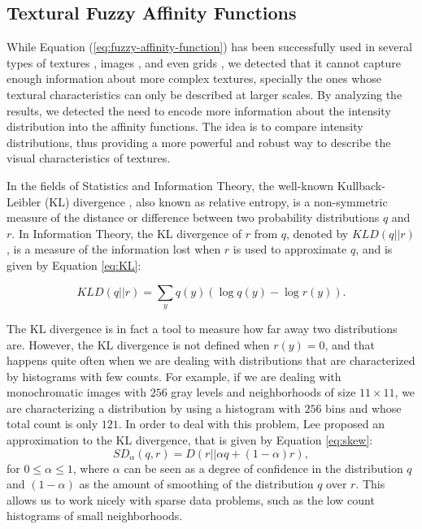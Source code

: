 \documentclass[10pt,twocolumn,letterpaper]{article}
\begin{document}
\subsection{Textural Fuzzy Affinity Functions}

While Equation (\ref{eq:fuzzy-affinity-function}) has been successfully used in several types of textures \cite{CARV12a}, images \cite{CARV05a,CARV06a}, and even grids \cite{CARV01a}, we detected that it cannot capture enough information about more complex textures, specially the ones whose textural characteristics can only be described at larger scales. By analyzing the results, we detected the need to encode more information about the intensity distribution into the affinity functions. The idea is to compare intensity distributions, thus providing a more powerful and robust way to describe the visual characteristics of textures. 

In the fields of Statistics and Information Theory, the well-known Kullback-Leibler (KL) divergence \cite{KULL51}, also known as relative entropy, is a non-symmetric measure of the distance or difference between two probability distributions $q$ and $r$. In Information Theory, the KL divergence of $r$ from $q$, denoted by $KLD(q||r)$, is a measure of the information lost when $r$ is used to approximate $q$, and is given by Equation \ref{eq:KL}:

 \begin{equation}
 KLD(q || r) = \sum_y q(y)(\log q(y) - \log r(y)).
 \label{eq:KL}
 \end{equation}
 
The KL divergence is in fact a tool to measure how far away two distributions are. However, the KL divergence is not defined when $r(y)=0$, and that happens quite often when we are dealing with distributions that are characterized by histograms with few counts. For example, if we are dealing with monochromatic images with $256$ gray levels and neighborhoods of size $11 \times 11$, we are characterizing a distribution by using a histogram with $256$ bins and whose total count is only $121$. In order to deal with this problem, Lee \cite{Lee99} proposed an approximation to the KL divergence, that is given by Equation \ref{eq:skew}:
\begin{equation}
SD_\alpha(q, r) = D(r || \alpha q + (1 - \alpha)r),
\label{eq:skew}
\end{equation}
for $0 \leq \alpha \leq 1 $, where $\alpha$ can be seen as a degree of confidence in the distribution $q$ and $(1 - \alpha)$ as the amount of smoothing of the distribution $q$ over $r$. This allows us to work nicely with sparse data problems, such as the low count histograms of small neighborhoods.
\end{document}
